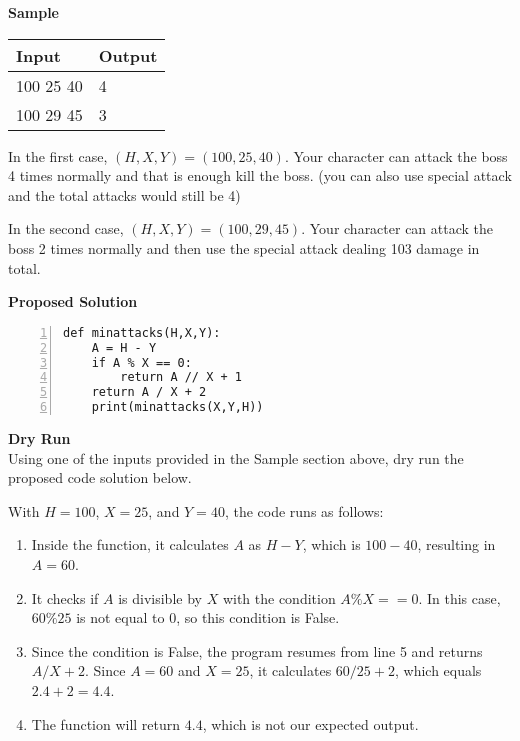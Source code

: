 \documentclass[a4paper]{exam}
\newcommand\heading[1]{\textbf{#1}}
\begin{document}
\begin{questions}
    \heading{Sample}

    \begin{tabularx}{\textwidth}{|X|X|}
        \rowcolor{gray!50}
        \hline
        Input     & Output \\ \hline\hline
        100 25 40 & 4      \\\hline
        100 29 45 & 3      \\\hline
    \end{tabularx}

    In the first case, $(H,X,Y)=(100,25,40)$. Your character can attack the boss 4 times normally and that is enough kill the boss. (you can also use special attack and the total attacks would still be 4)

    In the second case, $(H,X,Y)=(100,29,45)$. Your character can attack the boss 2 times normally and then use the special attack dealing 103 damage in total.

    \heading{Proposed Solution}
    \begin{Verbatim}[gobble =1 ,numbers=left,xleftmargin=5mm, numbersep=10pt, commandchars=\\\{\}]
 def minattacks(H,X,Y):
    A = H - Y
    if A % X == 0:
        return A // X + 1 
    return A / X + 2
    print(minattacks(X,Y,H))
    \end{Verbatim}

    \heading{Dry Run}\\
    Using one of the inputs provided in the Sample section above, dry run the proposed code solution below.


With $H=100$, $X=25$, and $Y=40$, the code runs as follows:

\begin{enumerate}
\item Inside the function, it calculates $A$ as $H - Y$, which is $100 - 40$, resulting in $A = 60$.

\item It checks if $A$ is divisible by $X$ with the condition $A \% X == 0$. In this case, $60 \% 25$ is not equal to $0$, so this condition is False.

\item Since the condition is False, the program resumes from line 5 and returns $A / X + 2$. Since $A = 60$ and $X = 25$, it calculates $60 / 25 + 2$, which equals $2.4 + 2 = 4.4$.

\item The function will return $4.4$, which is not our expected output.


\end{enumerate}
\end{questions}
\end{document}
